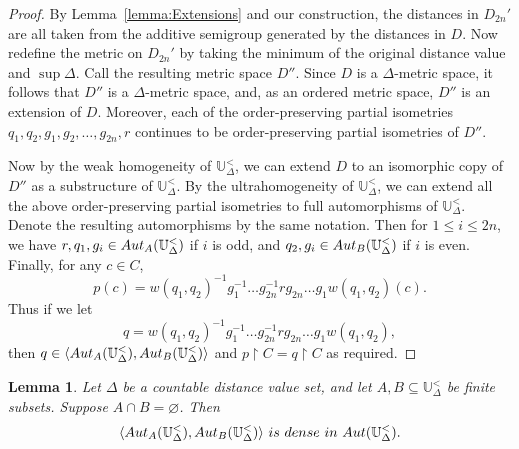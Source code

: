 \documentclass{amsart}
\newtheorem{lemma}[theorem]{Lemma}
\theoremstyle{definition}
\theoremstyle{remark}
\begin{document}
\begin{proof}
By Lemma~\ref{lemma:Extensions} and our construction, the distances in $D_{2n}'$ are all taken from the additive semigroup generated by the distances in $D$. Now redefine the metric on $D_{2n}'$ by taking the minimum of the original distance value and $\sup\Delta$. Call the resulting metric space $D''$. Since $D$ is a $\Delta$-metric space, it follows that $D''$ is a $\Delta$-metric space, and, as an ordered metric space, $D''$ is an extension of $D$. Moreover, each of the order-preserving partial isometries $q_1, q_2, g_1, g_2, \dots, g_{2n}, r$ continues to be order-preserving partial isometries of $D''$. 

Now by the weak homogeneity of $\mathbb{U}_{\Delta}^<$, we can extend $D$ to an isomorphic copy of $D''$ as a substructure of $\mathbb{U}_\Delta^<$. By the ultrahomogeneity of $\mathbb{U}_\Delta^<$, we can extend all the above order-preserving partial isometries to full automorphisms of $\mathbb{U}_{\Delta}^<$. Denote the resulting automorphisms by the same notation. Then for $1\leq i\leq 2n$, we have $r, q_1,g_i \in {\rm Aut}_A(\mathbb{U}_{\Delta}^<)$ if $i$ is odd, and $q_2,g_i \in {\rm Aut}_B(\mathbb{U}_{\Delta}^<)$ if $i$ is even. Finally, for any $c \in C$, \[p(c)=w(q_1,q_2)^{-1}g_1^{-1}\dots g_{2n}^{-1}rg_{2n}\dots g_1w(q_1,q_2)(c).\]
Thus if we let 
$$q=w(q_1,q_2)^{-1}g_1^{-1}\dots g_{2n}^{-1}rg_{2n}\dots g_1w(q_1,q_2), $$
then $q\in \langle {\rm Aut}_A(\mathbb{U}_\Delta^<), {\rm Aut}_B(\mathbb{U}_\Delta^<) \rangle$ and $p\upharpoonright C=q\upharpoonright C$ as required.
     \end{proof}

     \begin{lemma}\label{theorem:density}
        Let $\Delta$ be a countable distance value set, and let $A,B \subseteq \mathbb{U}_{\Delta}^<$ be finite subsets. Suppose $A \cap B = \varnothing$. Then \[\langle {\rm Aut}_A(\mathbb{U}_{\Delta}^<), {\rm Aut}_B(\mathbb{U}_{\Delta}^<) \rangle  \ is \ dense \ in \  {\rm Aut}(\mathbb{U}_{\Delta}^<).\]
\end{lemma}    
\end{document}
